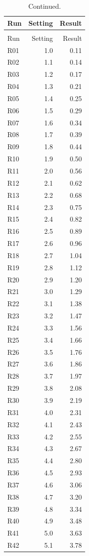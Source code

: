 \begin{longtable}{lrr}
  \caption{Extended parameter sweep spanning more than one page.}
  \label{tab:example-long}\\
  \toprule
  Run & Setting & Result \\
  \midrule
  \endfirsthead
  \caption[]{Continued.}\\
  \toprule
  Run & Setting & Result \\
  \midrule
  \endhead
  \bottomrule
  \endfoot
  R01 & 1.0 & 0.11 \\ R02 & 1.1 & 0.14 \\ R03 & 1.2 & 0.17 \\
  R04 & 1.3 & 0.21 \\ R05 & 1.4 & 0.25 \\ R06 & 1.5 & 0.29 \\
  R07 & 1.6 & 0.34 \\ R08 & 1.7 & 0.39 \\ R09 & 1.8 & 0.44 \\
  R10 & 1.9 & 0.50 \\ R11 & 2.0 & 0.56 \\ R12 & 2.1 & 0.62 \\
  R13 & 2.2 & 0.68 \\ R14 & 2.3 & 0.75 \\ R15 & 2.4 & 0.82 \\
  R16 & 2.5 & 0.89 \\ R17 & 2.6 & 0.96 \\ R18 & 2.7 & 1.04 \\
  R19 & 2.8 & 1.12 \\ R20 & 2.9 & 1.20 \\ R21 & 3.0 & 1.29 \\
  R22 & 3.1 & 1.38 \\ R23 & 3.2 & 1.47 \\ R24 & 3.3 & 1.56 \\
  R25 & 3.4 & 1.66 \\ R26 & 3.5 & 1.76 \\ R27 & 3.6 & 1.86 \\
  R28 & 3.7 & 1.97 \\ R29 & 3.8 & 2.08 \\ R30 & 3.9 & 2.19 \\
  R31 & 4.0 & 2.31 \\ R32 & 4.1 & 2.43 \\ R33 & 4.2 & 2.55 \\
  R34 & 4.3 & 2.67 \\ R35 & 4.4 & 2.80 \\ R36 & 4.5 & 2.93 \\
  R37 & 4.6 & 3.06 \\ R38 & 4.7 & 3.20 \\ R39 & 4.8 & 3.34 \\
  R40 & 4.9 & 3.48 \\ R41 & 5.0 & 3.63 \\ R42 & 5.1 & 3.78 \\
\end{longtable}

